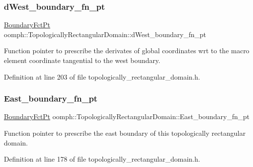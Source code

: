 \subsubsection{\texorpdfstring{d\+West\+\_\+boundary\+\_\+fn\+\_\+pt}{dWest\_boundary\_fn\_pt}}
{\footnotesize\ttfamily \hyperlink{classoomph_1_1TopologicallyRectangularDomain_a8b2e24f5500d86c93aef509c5410e7cc}{Boundary\+Fct\+Pt} oomph\+::\+Topologically\+Rectangular\+Domain\+::d\+West\+\_\+boundary\+\_\+fn\+\_\+pt\hspace{0.3cm}{\ttfamily [private]}}



Function pointer to prescribe the derivates of global coordinates wrt to the macro element coordinate tangential to the west boundary. 



Definition at line 203 of file topologically\+\_\+rectangular\+\_\+domain.\+h.

\mbox{\label{classoomph_1_1TopologicallyRectangularDomain_ac6f1166ec8fd2e62704512bfb612dfb4}} 
\subsubsection{\texorpdfstring{East\+\_\+boundary\+\_\+fn\+\_\+pt}{East\_boundary\_fn\_pt}}
{\footnotesize\ttfamily \hyperlink{classoomph_1_1TopologicallyRectangularDomain_a8b2e24f5500d86c93aef509c5410e7cc}{Boundary\+Fct\+Pt} oomph\+::\+Topologically\+Rectangular\+Domain\+::\+East\+\_\+boundary\+\_\+fn\+\_\+pt\hspace{0.3cm}{\ttfamily [private]}}



Function pointer to prescribe the east boundary of this topologically rectangular domain. 



Definition at line 178 of file topologically\+\_\+rectangular\+\_\+domain.\+h.

\mbox{\label{classoomph_1_1TopologicallyRectangularDomain_a78adac085b81bd6efed96c43f9c1f8a2}} 
